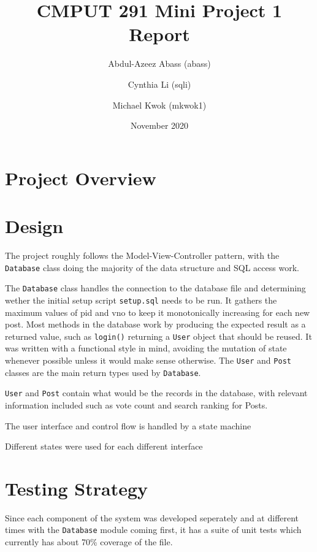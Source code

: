 \documentclass{article}
\title{CMPUT 291 Mini Project 1 Report}
\date{November 2020}
\author{Abdul-Azeez Abass (abass)\\
\and Cynthia Li (sqli)\\
\and Michael Kwok (mkwok1)}
\begin{document}
\maketitle

\section{Project Overview}

\section{Design}

The project roughly follows the Model-View-Controller pattern, with the \verb|Database| class doing the majority of the data structure and SQL access work. %

The \verb|Database| class handles the connection to the database file and determining wether the initial setup script \verb|setup.sql| needs to be run. It gathers the maximum values of pid and vno to keep it monotonically increasing for each new post. Most methods in the database work by producing the expected result as a returned value, such as \verb|login()| returning a \verb|User| object that should be reused. It was written with a functional style in mind, avoiding the mutation of state whenever possible unless it would make sense otherwise. The \verb|User| and \verb|Post| classes are the main return types used by \verb|Database|.

\verb|User| and \verb|Post| contain what would be the records in the database, with relevant information included such as vote count and search ranking for Posts.

The user interface and control flow is handled by a state machine %

Different states were used for each different interface %


\section{Testing Strategy}
Since each component of the system was developed seperately and at different times with the \verb|Database| module coming first, it has a suite of unit tests which currently has about 70\% coverage of the file.
\end{document}
